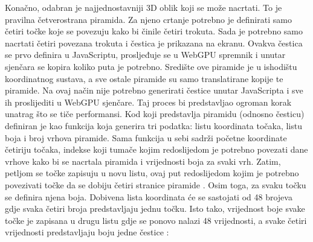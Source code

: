 \documentclass{foi}
\begin{document}
Konačno, odabran je najjednostavniji 3D oblik koji se može nacrtati. To je pravilna četverostrana piramida. Za njeno crtanje potrebno je definirati samo četiri točke koje se povezuju kako bi činile četiri trokuta. Sada je potrebno samo nacrtati četiri povezana trokuta i čestica je prikazana na ekranu. Ovakva čestica se prvo definira u JavaScriptu, prosljeđuje se u WebGPU spremnik i unutar sjenčara se kopira koliko puta je potrebno. Središte ove piramide je u ishodištu koordinatnog sustava, a sve ostale piramide su samo translatirane kopije te piramide. Na ovaj način nije potrebno generirati čestice unutar JavaScripta i sve ih proslijediti u WebGPU sjenčare. Taj proces bi predstavljao ogroman korak unatrag što se tiče performansi. Kod koji predstavlja piramidu (odnosno česticu) definiran je kao funkcija koja generira tri podatka: listu koordinata točaka, listu boja i broj vrhova piramide. Sama funkcija u sebi sadrži početne koordinate četiriju točaka, indekse koji tumače kojim redoslijedom je potrebno povezati dane vrhove kako bi se nacrtala piramida i vrijednosti boja za svaki vrh. Zatim, petljom se točke zapisuju u novu listu, ovaj put redoslijedom kojim je potrebno povezivati točke da se dobiju četiri stranice piramide \parencite{WebGPUFundamentalsCameras}. Osim toga, za svaku točku se definira njena boja. Dobivena lista koordinata će se sastojati od 48 brojeva gdje svaka četiri broja predstavljaju jednu točku. Isto tako, vrijednost boje svake točke je zapisana u drugu listu gdje se ponovo nalazi 48 vrijednosti, a svake četiri vrijednosti predstavljaju boju jedne čestice \parencite{WebGPUFundamentalsTextures}:
\end{document}

